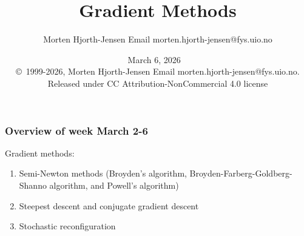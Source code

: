 \documentclass{beamer}
\begin{document}

\newcommand{\exercisesection}[1]{\subsection*{#1}}







\title{Gradient Methods}


\author{Morten Hjorth-Jensen  Email morten.hjorth-jensen@fys.uio.no}

\date{March 6, 2026
\ \\ 
{\tiny \copyright\ 1999-2026, Morten Hjorth-Jensen  Email morten.hjorth-jensen@fys.uio.no. Released under CC Attribution-NonCommercial 4.0 license}
}

\begin{frame}
\titlepage
\end{frame}

\begin{frame}
\frametitle{Overview of week March 2-6}

\begin{block}{Gradient methods: }
\begin{enumerate}
\item Semi-Newton methods (Broyden's algorithm, Broyden-Farberg-Goldberg-Shanno algorithm, and Powell's algorithm)

\item Steepest descent and conjugate gradient descent

\item Stochastic reconfiguration
\end{enumerate}

\noindent
\end{block}
\end{frame}
\end{document}
